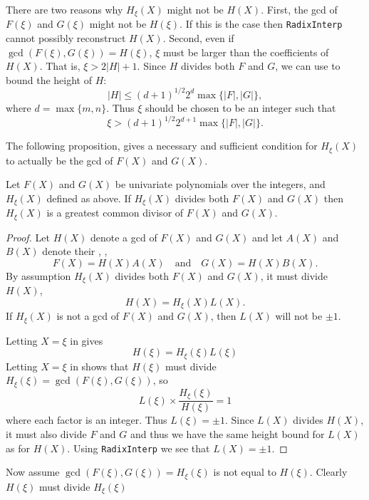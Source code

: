 There are two reasons why $H_{\xi}(X)$ might not be $H(X)$.  First,
the {\sc gcd} of $F(\xi)$ and $G(\xi)$ might not be $H(\xi)$.  If this is
the case then {\tt RadixInterp} cannot possibly reconstruct $H(X)$.
Second, even if $\gcd(F(\xi), G(\xi)) = H(\xi)$, $\xi$ must be larger
than the coefficients of $H(X)$.  That is, $\xi > 2|H|+1$.  Since $H$
divides both $F$ and $G$, we can use 
to bound the height of $H$:
\[
|H| \le (d+1)^{1/2} 2^d \max\{ |F|, |G| \},
\]
where $d = \max \{m, n\}$.  Thus $\xi$ should be chosen to be an
integer such that
\[
\xi > (d+1)^{1/2} 2^{d+1} \max\{ |F|, |G| \}.
\]

The following proposition, gives a necessary and sufficient condition
for $H_{\xi}(X)$ to actually be the {\sc gcd} of $F(X)$ and $G(X)$.

\begin{proposition}
Let $F(X)$ and $G(X)$ be univariate polynomials over the integers, and
$H_{\xi}(X)$ defined as above.  If $H_{\xi}(X)$ divides both $F(X)$
and $G(X)$ then $H_{\xi}(X)$ is a greatest common divisor of $F(X)$
and $G(X)$.
\end{proposition}

\begin{proof}
Let $H(X)$ denote a {\sc gcd} of $F(X)$ and $G(X)$ and let $A(X)$ and $B(X)$
denote their , \ie,
\begin{equation} \label{PGCD:HeuGCD:Eqa}
F(X) = H(X) A(X) \quad \mbox{and} \quad G(X) = H(X) B(X).
\end{equation}
By assumption $H_{\xi}(X)$ divides both $F(X)$ and $G(X)$, it must
divide $H(X)$,
\begin{equation} \label{PGCD:HeuGCD:Eqb}
H(X) = H_{\xi}(X) L(X).
\end{equation}
If $H_{\xi}(X)$ is not a {\sc gcd} of $F(X)$ and $G(X)$, then $L(X)$ will
not be $\pm 1$.

Letting $X= \xi$ in  gives
\[
H(\xi) = H_{\xi}(\xi) L(\xi)
\]
Letting $X = \xi$ in  shows that $H(\xi)$ must
divide $H_{\xi}(\xi) = \gcd(F(\xi), G(\xi))$, so
\[
L(\xi) \times \frac{H_{\xi}(\xi)}{H(\xi)} = 1
\]
where each factor is an integer.  Thus $L(\xi) = \pm 1$.  Since $L(X)$
divides $H(X)$, it must also divide $F$ and $G$ and thus we have the
same height bound for $L(X)$ as for $H(X)$.   Using {\tt RadixInterp}
we see that $L(X) = \pm 1$.
\end{proof}

Now assume $\gcd(F(\xi), G(\xi)) = H_{\xi}(\xi)$ is not equal to
$H(\xi)$.  
Clearly $H(\xi)$ must divide $H_{\xi}(\xi)$

